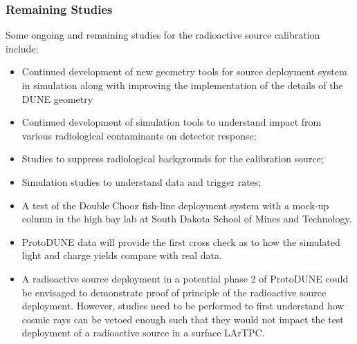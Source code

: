 \subsubsection{Remaining Studies}
Some ongoing and remaining studies for the radioactive source calibration include:
\begin{itemize}
\item Continued development of new geometry tools for source deployment system in simulation along with improving the implementation of the details of the DUNE geometry
\item Continued development of simulation tools to understand impact from various radiological contaminants on detector response;
\item Studies to suppress radiological backgrounds for the calibration source;
\item Simulation studies to understand data and trigger rates;
\item %
A test of the Double Chooz fish-line deployment system with a  mock-up column in the high bay lab at South Dakota School of Mines and Technology.
\item ProtoDUNE data will provide the first cross check as to how the simulated light and charge yields compare with real data. 
\item A radioactive source deployment in a potential phase 2 of ProtoDUNE could be envisaged to demonstrate proof of principle of the radioactive source deployment. However, studies need to be performed to first understand how cosmic rays can be vetoed enough such that they would not impact the test deployment of a radioactive source in a surface LArTPC. 
\end{itemize}